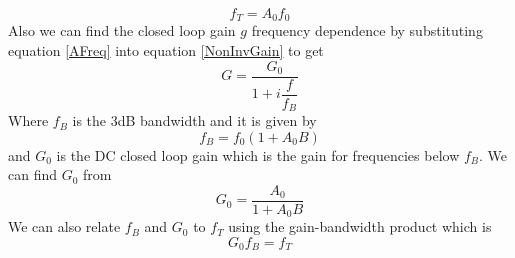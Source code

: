 \documentclass[11pt]{article}
\numberwithin{equation}{section}
\numberwithin{figure}{section}
\numberwithin{table}{section}
\begin{document}
\begin{equation}
f_T = A_0f_0
\label{fTEqu}
\end{equation}
Also we can find the closed loop gain $g$ frequency dependence by substituting equation \ref{AFreq} into equation \ref{NonInvGain} to get
\begin{equation}
G = \frac{G_0}{1+i\dfrac{f}{f_B}}
\label{FreqGain}
\end{equation}
Where $f_B$ is the $3$dB bandwidth and it is given by
\begin{equation}
f_B =  f_0(1+A_0B)
\label{FreqB}
\end{equation}
and $G_0$ is the DC closed loop gain which is the gain for frequencies below $f_B$. We can find $G_0$ from
\begin{equation}
G_0 = \frac{A_0}{1+A_0B}
\label{G0NonInv}
\end{equation}
We can also relate $f_B$ and $G_0$ to $f_T$ using the gain-bandwidth product which is
\begin{equation}
G_0f_B = f_T
\label{GainBandProd}
\end{equation}
\end{document}
